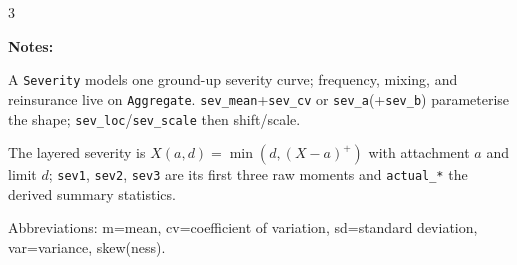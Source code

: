 \begin{multicols*}{3}



\bigskip \raggedright
{\bf Notes:}

A \texttt{Severity} models one ground-up severity curve; frequency, mixing, and reinsurance live on \texttt{Aggregate}. \texttt{sev\_mean}+\texttt{sev\_cv} or \texttt{sev\_a}(+\texttt{sev\_b}) parameterise the shape; \texttt{sev\_loc}/\texttt{sev\_scale} then shift/scale.

The layered severity is $X(a, d) = \min(d, (X-a)^+)$ with attachment $a$ and limit $d$; \texttt{sev1}, \texttt{sev2}, \texttt{sev3} are its first three raw moments and \texttt{actual\_*} the derived summary statistics.

Abbreviations: m=mean, cv=coefficient of variation, sd=standard deviation, var=variance, skew(ness).


\makefooter

\end{multicols*}


